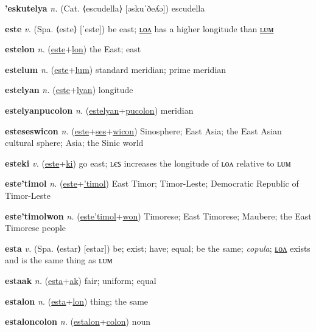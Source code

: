 \textbf{\hypertarget{'eskutelya}{'eskutelya}} \textit{n.} (Cat. ⟨escudella⟩ [əskuˈðeʎə])
escudella

\textbf{\hypertarget{este}{este}} \textit{v.} (Spa. ⟨este⟩ [ˈeste])
be east; \hyperlink{estelon}{ʟᴏᴧ} has a higher longitude than \hyperlink{estelum}{ʟᴜᴍ}

\textbf{\hypertarget{estelon}{estelon}} \textit{n.} (\hyperlink{este}{este}+\allowbreak \hyperlink{lon}{lon})
the East; east

\textbf{\hypertarget{estelum}{estelum}} \textit{n.} (\hyperlink{este}{este}+\allowbreak \hyperlink{lum}{lum})
standard meridian; prime meridian

\textbf{\hypertarget{estelyan}{estelyan}} \textit{n.} (\hyperlink{este}{este}+\allowbreak \hyperlink{lyan}{lyan})
longitude

\textbf{\hypertarget{estelyanpucolon}{estelyanpucolon}} \textit{n.} (\hyperlink{estelyan}{estelyan}+\allowbreak \hyperlink{pucolon}{pucolon})
meridian

\textbf{\hypertarget{esteseswicon}{esteseswicon}} \textit{n.} (\hyperlink{este}{este}+\allowbreak \hyperlink{ses}{ses}+\allowbreak \hyperlink{wicon}{wicon})
Sinosphere; East Asia; the East Asian cultural sphere; Asia; the Sinic world

\textbf{\hypertarget{esteki}{esteki}} \textit{v.} (\hyperlink{este}{este}+\allowbreak \hyperlink{ki}{ki})
go east; ʟєꜱ increases the longitude of ʟᴏᴧ relative to ʟᴜᴍ

\textbf{\hypertarget{este'timol}{este'timol}} \textit{n.} (\hyperlink{este}{este}+\allowbreak \hyperlink{'timol}{'timol})
East Timor; Timor-Leste; Democratic Republic of Timor-Leste

\textbf{\hypertarget{este'timolwon}{este'timolwon}} \textit{n.} (\hyperlink{este'timol}{este'timol}+\allowbreak \hyperlink{won}{won})
Timorese; East Timorese; Maubere; the East Timorese people

\textbf{\hypertarget{esta}{esta}} \textit{v.} (Spa. ⟨estar⟩ [estar])
be; exist; have; equal; be the same; \textit{copula}; \hyperlink{estalon}{ʟᴏᴧ} exists and is the same thing as ʟᴜᴍ

\textbf{\hypertarget{estaak}{estaak}} \textit{n.} (\hyperlink{esta}{esta}+\allowbreak \hyperlink{ak}{ak})
fair; uniform; equal

\textbf{\hypertarget{estalon}{estalon}} \textit{n.} (\hyperlink{esta}{esta}+\allowbreak \hyperlink{lon}{lon})
thing; the same

\textbf{\hypertarget{estaloncolon}{estaloncolon}} \textit{n.} (\hyperlink{estalon}{estalon}+\allowbreak \hyperlink{colon}{colon})
noun

